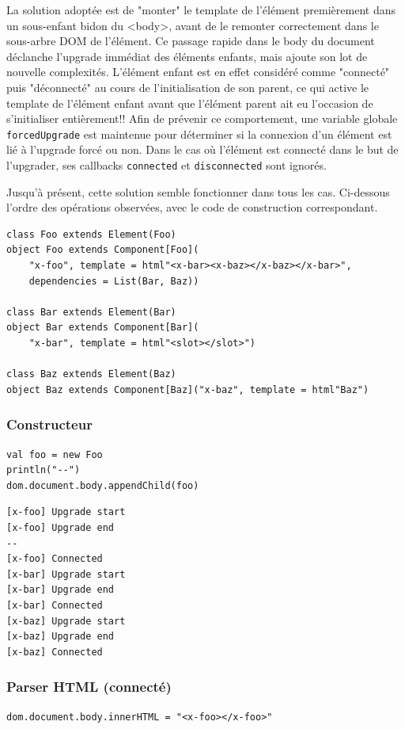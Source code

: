 La solution adoptée est de "monter" le template de l'élément premièrement dans un sous-enfant bidon du <body>, avant de le remonter correctement dans le sous-arbre DOM de l'élément. Ce passage rapide dans le body du document déclanche l'upgrade immédiat des éléments enfants, mais ajoute son lot de nouvelle complexités. L'élément enfant est en effet considéré comme "connecté" puis "déconnecté" au cours de l'initialisation de son parent, ce qui active le template de l'élément enfant avant que l'élément parent ait eu l'occasion de s'initialiser entièrement!! Afin de prévenir ce comportement, une variable globale \texttt{forcedUpgrade} est maintenue pour déterminer si la connexion d'un élément est lié à l'upgrade forcé ou non. Dans le cas où l'élément est connecté dans le but de l'upgrader, ses callbacks \texttt{connected} et \texttt{disconnected} sont ignorés.

Jusqu'à présent, cette solution semble fonctionner dans tous les cas. Ci-dessous l'ordre des opérations observées, avec le code de construction correspondant.

\begin{lstlisting}
class Foo extends Element(Foo)
object Foo extends Component[Foo](
	"x-foo", template = html"<x-bar><x-baz></x-baz></x-bar>",
	dependencies = List(Bar, Baz))

class Bar extends Element(Bar)
object Bar extends Component[Bar](
	"x-bar", template = html"<slot></slot>")

class Baz extends Element(Baz)
object Baz extends Component[Baz]("x-baz", template = html"Baz")
\end{lstlisting}

\subsubsection{Constructeur}
\begin{lstlisting}
val foo = new Foo
println("--")
dom.document.body.appendChild(foo)
\end{lstlisting}

\begin{lstlisting}
[x-foo] Upgrade start
[x-foo] Upgrade end
--
[x-foo] Connected
[x-bar] Upgrade start
[x-bar] Upgrade end
[x-bar] Connected
[x-baz] Upgrade start
[x-baz] Upgrade end
[x-baz] Connected
\end{lstlisting}

\subsubsection{Parser HTML (connecté)}
\begin{lstlisting}
dom.document.body.innerHTML = "<x-foo></x-foo>"
\end{lstlisting}

